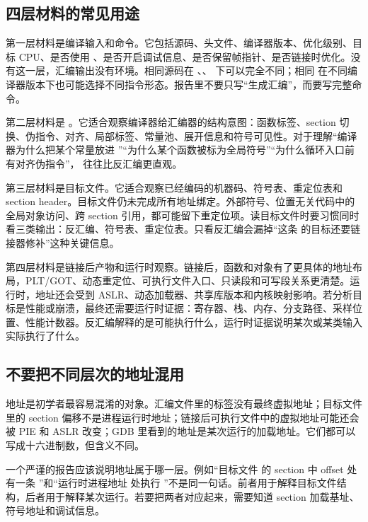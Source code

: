 \subsection{四层材料的常见用途}

第一层材料是编译输入和命令。它包括源码、头文件、编译器版本、优化级别、目标 CPU、是否使用 、是否开启调试信息、是否保留帧指针、是否链接时优化。没有这一层，汇编输出没有环境。相同源码在 、、 下可以完全不同；相同  在不同编译器版本下也可能选择不同指令形态。报告里不要只写“生成汇编”，而要写完整命令。

第二层材料是 。它适合观察编译器给汇编器的结构意图：函数标签、section 切换、伪指令、对齐、局部标签、常量池、展开信息和符号可见性。对于理解“编译器为什么把某个常量放进 ”“为什么某个函数被标为全局符号”“为什么循环入口前有对齐伪指令”， 往往比反汇编更直观。

第三层材料是目标文件。它适合观察已经编码的机器码、符号表、重定位表和 section header。目标文件仍未完成所有地址绑定。外部符号、位置无关代码中的全局对象访问、跨 section 引用，都可能留下重定位项。读目标文件时要习惯同时看三类输出：反汇编、符号表、重定位表。只看反汇编会漏掉“这条  的目标还要链接器修补”这种关键信息。

第四层材料是链接后产物和运行时观察。链接后，函数和对象有了更具体的地址布局，PLT/GOT、动态重定位、可执行文件入口、只读段和可写段关系更清楚。运行时，地址还会受到 ASLR、动态加载器、共享库版本和内核映射影响。若分析目标是性能或崩溃，最终还需要运行时证据：寄存器、栈、内存、分支路径、采样位置、性能计数器。反汇编解释的是可能执行什么，运行时证据说明某次或某类输入实际执行了什么。

\subsection{不要把不同层次的地址混用}

地址是初学者最容易混淆的对象。汇编文件里的标签没有最终虚拟地址；目标文件里的 section 偏移不是进程运行时地址；链接后可执行文件中的虚拟地址可能还会被 PIE 和 ASLR 改变；GDB 里看到的地址是某次运行的加载地址。它们都可以写成十六进制数，但含义不同。

一个严谨的报告应该说明地址属于哪一层。例如“目标文件  的  section 中 offset  处有一条 ”和“运行时进程地址  处执行 ”不是同一句话。前者用于解释目标文件结构，后者用于解释某次运行。若要把两者对应起来，需要知道 section 加载基址、符号地址和调试信息。

